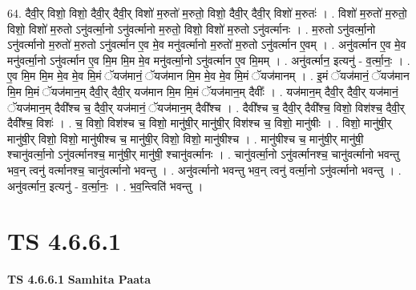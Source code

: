 \documentclass[17pt]{extarticle}
\begin{document}
64. दैवी॒र् विशो॒ विशो॒ दैवी॒र् दैवी॒र् विशो॑ म॒रुतो॑ म॒रुतो॒ विशो॒ दैवी॒र् दैवी॒र् विशो॑ म॒रुतः॑ । . विशो॑ म॒रुतो॑ म॒रुतो॒ विशो॒ विशो॑ म॒रुतो ऽनु॑वर्त्मा॒नो ऽनु॑वर्त्मानो म॒रुतो॒ विशो॒ विशो॑ म॒रुतो ऽनु॑वर्त्मानः । . म॒रुतो ऽनु॑वर्त्मा॒नो ऽनु॑वर्त्मानो म॒रुतो॑ म॒रुतो ऽनु॑वर्त्मान ए॒व मे॒व मनु॑वर्त्मानो म॒रुतो॑ म॒रुतो ऽनु॑वर्त्मान ए॒वम् । . अनु॑वर्त्मान ए॒व मे॒व मनु॑वर्त्मा॒नो ऽनु॑वर्त्मान ए॒व मि॒म मि॒म मे॒व मनु॑वर्त्मा॒नो ऽनु॑वर्त्मान ए॒व मि॒मम् । . अनु॑वर्त्मान॒ इत्यनु॑ - व॒र्त्मा॒नः॒ । . ए॒व मि॒म मि॒म मे॒व मे॒व मि॒मं ॅयज॑मानं॒ ॅयज॑मान मि॒म मे॒व मे॒व मि॒मं ॅयज॑मानम् । . इ॒मं ॅयज॑मानं॒ ॅयज॑मान मि॒म मि॒मं ॅयज॑मान॒म् दैवी॒र् दैवी॒र् यज॑मान मि॒म मि॒मं ॅयज॑मान॒म् दैवीः᳚ । . यज॑मान॒म् दैवी॒र् दैवी॒र् यज॑मानं॒ ॅयज॑मान॒म् दैवी᳚श्च च॒ दैवी॒र् यज॑मानं॒ ॅयज॑मान॒म् दैवी᳚श्च । . दैवी᳚श्च च॒ दैवी॒र् दैवी᳚श्च॒ विशो॒ विश॑श्च॒ दैवी॒र् दैवी᳚श्च॒ विशः॑ । . च॒ विशो॒ विश॑श्च च॒ विशो॒ मानु॑षी॒र् मानु॑षी॒र् विश॑श्च च॒ विशो॒ मानु॑षीः । . विशो॒ मानु॑षी॒र् मानु॑षी॒र् विशो॒ विशो॒ मानु॑षीश्च च॒ मानु॑षी॒र् विशो॒ विशो॒ मानु॑षीश्च । . मानु॑षीश्च च॒ मानु॑षी॒र् मानु॑षी॒ श्चानु॑वर्त्मा॒नो ऽनु॑वर्त्मानश्च॒ मानु॑षी॒र् मानु॑षी॒ श्चानु॑वर्त्मानः । . चानु॑वर्त्मा॒नो ऽनु॑वर्त्मानश्च॒ चानु॑वर्त्मानो भवन्तु भव॒न् त्वनु॑ वर्त्मानश्च॒ चानु॑वर्त्मानो भवन्तु । . अनु॑वर्त्मानो भवन्तु भव॒न् त्वनु॑ वर्त्मा॒नो ऽनु॑वर्त्मानो भवन्तु । . अनु॑वर्त्मान॒ इत्यनु॑ - व॒र्त्मा॒नः॒ । . भ॒व॒न्त्विति॑ भवन्तु । \newline
\pagebreak
{}

\section{ TS 4.6.6.1 }

\textbf{TS 4.6.6.1 } \newline
\textbf{Samhita Paata} \newline
\end{document}
